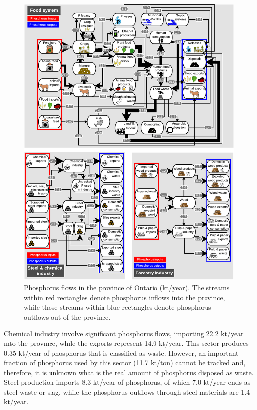 \documentclass[authoryear]{elsarticle}
\begin{document}
\begin{figure}[H]
	\centering
	\includegraphics[width=0.95\linewidth, trim={0cm 0cm 0cm 0cm},clip]{Figures/Diagram2-4.pdf} 
	\caption{Phosphorus flows in the province of Ontario (kt/year). The streams within red rectangles denote phosphorus inflows into the province, while those streams within blue rectangles denote phosphorus outflows out of the province.}
	\label{fig:FigFlowsSummary}
\end{figure}

Chemical industry involve significant phosphorus flows, importing 22.2 kt/year into the province, while the exports represent 14.0 kt/year. This sector produces 0.35 kt/year of phosphorus that is classified as waste. However, an important fraction of phosphorus used by this sector (11.7 kt/ton) cannot be tracked and, therefore, it is unknown what is the real amount of phosphorus disposed as waste.  Steel production imports 8.3 kt/year of phosphorus, of which 7.0 kt/year ends as steel waste or slag, while the phosphorus outflows through steel materials are 1.4 kt/year.
\end{document}
